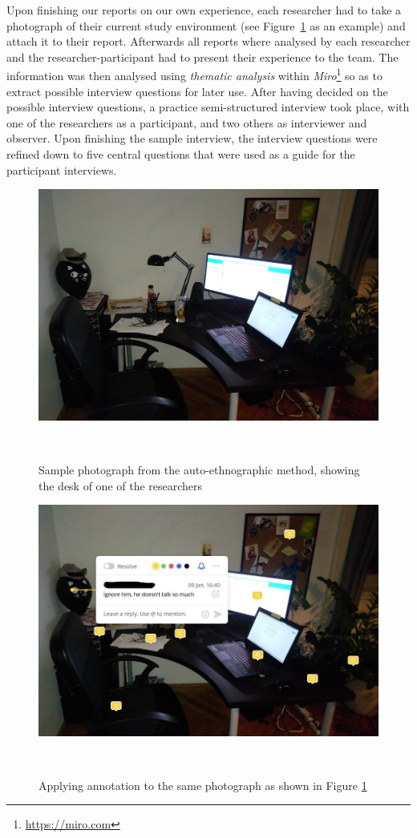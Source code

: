 \documentclass{sigchi}
\begin{document}
Upon finishing our reports on our own experience, each researcher had to take a photograph of their current study environment (see Figure~\ref{fig:figure1} as an example) and attach it to their report. Afterwards all reports where analysed by each researcher and the researcher-participant had to present their experience to the team. The information was then analysed using \emph{thematic analysis} within \emph{Miro}\footnote{\url{https://miro.com}} so as to extract possible interview questions for later use. After having decided on the possible interview questions, a practice semi-structured interview took place, with one of the researchers as a participant, and two others as interviewer and observer. Upon finishing the sample interview, the interview questions were refined down to five central questions that were used as a guide for the participant interviews.
\begin{figure}
\centering
  \includegraphics[width=1\columnwidth]{figures/auto-ethnography.JPG}
  \caption{Sample photograph from the auto-ethnographic method, showing the desk of one of the researchers}~\label{fig:figure1}
\end{figure}

\begin{figure}
\centering
  \includegraphics[width=1\columnwidth]{figures/auto-ethnography-annotated.JPG}
  \caption{Applying annotation to the same photograph as shown in Figure \ref{fig:figure1}}~\label{fig:figure2}
\end{figure}
\end{document}
